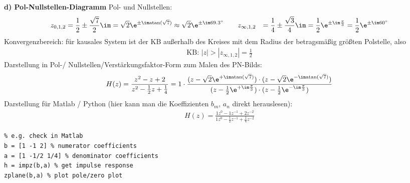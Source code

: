 \begin{Loesung}
\noindent\textbf{d) Pol-Nullstellen-Diagramm}
Pol- und Nullstellen:
\begin{align}
z_{0,1,2} &= \frac{1}{2} \pm \frac{\sqrt{7}}{2}\im = \sqrt{2} \e^{\pm \im \mathrm{atan}(\sqrt{7})} \approx \sqrt{2} \e^{\pm \im 69.3^\circ}\qquad
z_{\infty,1,2} &= \frac{1}{4} \pm \frac{\sqrt{3}}{4}\im = \frac{1}{2}\e^{\pm \im \frac{\pi}{3}} = \frac{1}{2}\e^{\pm \im 60^\circ}
\end{align}
Konvergenzbereich: für kausales System ist der KB außerhalb des Kreises mit dem Radius
der betragsmäßig größten Polstelle, also
\begin{align}
\text{KB: } |z| > |z_{\infty,1,2}| = \frac{1}{2}
\end{align}
%
Darstellung in Pol-/ Nullstellen/Verstärkungsfaktor-Form zum Malen des PN-Bilds:
\begin{align}
H(z) = \frac{z^2 - z + 2}{z^2 - \frac{1}{2}z + \frac{1}{4}}
= 1 \cdot \frac
{(z-\sqrt{2} \e^{+\im \mathrm{atan}(\sqrt{7})}) \cdot (z-\sqrt{2} \e^{-\im \mathrm{atan}(\sqrt{7})})}
{(z-\frac{1}{2}\e^{+\im \frac{\pi}{3}}) \cdot (z-\frac{1}{2}\e^{-\im \frac{\pi}{3}})}
\end{align}
%
Darstellung für Matlab / Python (hier kann man die Koeffizienten $b_m$, $a_n$ direkt
herauslesen):
\begin{align}
H(z) = \frac{1 z^0 - 1 z^{-1} + 2 z^{-2}}{1 z^0 - \frac{1}{2} z^{-1} + \frac{1}{4} z^{-2}}
\end{align}
\begin{verbatim}
% e.g. check in Matlab
b = [1 -1 2] % numerator coefficients
a = [1 -1/2 1/4] % denominator coefficients
h = impz(b,a) % get impulse response
zplane(b,a) % plot pole/zero plot
\end{verbatim}


\end{Loesung}
